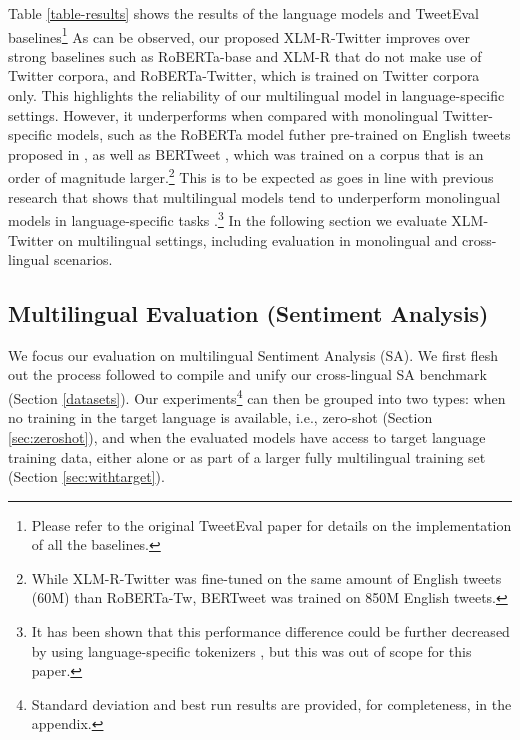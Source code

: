 \documentclass[10pt, a4paper]{article}
\begin{document}
Table \ref{table-results} shows the results of the language models and TweetEval baselines\footnote{Please refer to the original TweetEval paper for details on the implementation of all the baselines.} As can be observed, our proposed XLM-R-Twitter improves over strong baselines such as RoBERTa-base and XLM-R that do not make use of Twitter corpora, and RoBERTa-Twitter, which is trained on Twitter corpora only. This highlights the reliability of our multilingual model in language-specific settings. However, it underperforms when compared with monolingual Twitter-specific models, such as the RoBERTa model futher pre-trained on English tweets proposed in \cite{barbieri-etal-2020-tweeteval}, as well as BERTweet \cite{nguyen-etal-2020-bertweet}, which was trained on a corpus that is an order of magnitude larger.\footnote{While XLM-R-Twitter was fine-tuned on the same amount of English tweets (60M) than RoBERTa-Tw, BERTweet was trained on 850M English tweets.} This is to be expected as goes in line with previous research that shows that multilingual models tend to underperform monolingual models in language-specific tasks \cite{rust2020good}.\footnote{It has been shown that this performance difference could be further decreased by using language-specific tokenizers \cite{rust2020good}, but this was out of scope for this paper.}   In the following section we evaluate XLM-Twitter on multilingual settings, including evaluation in monolingual and cross-lingual scenarios.






\subsection{Multilingual Evaluation (Sentiment Analysis)}
\label{cross:eval}

We focus our evaluation on multilingual Sentiment Analysis (SA). We first flesh out the process followed to compile and unify our cross-lingual SA benchmark (Section \ref{datasets}). Our experiments\footnote{Standard deviation and best run results are provided, for completeness, in the appendix.} can then be grouped into two types: when no training in the target language is available, i.e., zero-shot (Section \ref{sec:zeroshot}), and when the evaluated models have access to target language training data, either alone or as part of a larger fully multilingual training set (Section \ref{sec:withtarget}).
\end{document}
